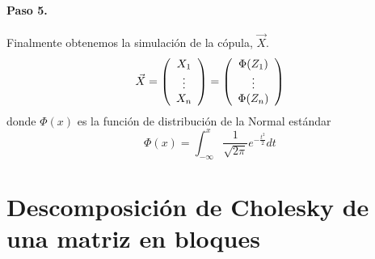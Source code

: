 \paragraph{Paso 5.} Finalmente obtenemos la simulaci\'on de la c\'opula, $\vec{X}$.
\begin{displaymath}
\vec{X} =
\left(
\begin{array}{c}
X_1 \cr
\vdots \cr
X_n
\end{array}
\right) 
=
\left(
\begin{array}{c}
\Phi(Z_1) \cr
\vdots \cr
\Phi(Z_n)
\end{array}
\right) 
\end{displaymath}
donde $\Phi(x)$ es la funci\'on de distribuci\'on de la Normal est\'andar
\begin{displaymath}
\Phi(x) = \int_{-\infty}^{x} \frac{1}{\sqrt{2 \pi}} e^{-\frac{t^2}{2}} dt
\end{displaymath}


\section{Descomposici\'on de Cholesky de una matriz en bloques}
\label{apendix:cholblock}

